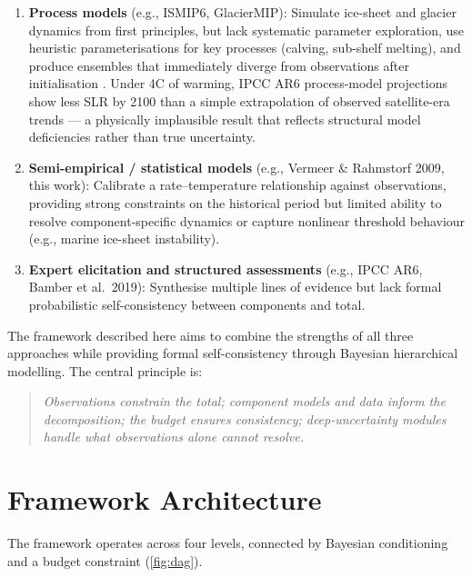 \documentclass[11pt]{article}
\begin{document}
\begin{enumerate}
  \item \textbf{Process models} (e.g., ISMIP6, GlacierMIP): Simulate ice-sheet and glacier dynamics from first principles, but lack systematic parameter exploration, use heuristic parameterisations for key processes (calving, sub-shelf melting), and produce ensembles that immediately diverge from observations after initialisation \citep{fricker2025antarctica}.  Under 4\textdegree C of warming, IPCC AR6 process-model projections show less SLR by 2100 than a simple extrapolation of observed satellite-era trends --- a physically implausible result that reflects structural model deficiencies rather than true uncertainty.

  \item \textbf{Semi-empirical / statistical models} (e.g., Vermeer \& Rahmstorf 2009, this work): Calibrate a rate--temperature relationship against observations, providing strong constraints on the historical period but limited ability to resolve component-specific dynamics or capture nonlinear threshold behaviour (e.g., marine ice-sheet instability).

  \item \textbf{Expert elicitation and structured assessments} (e.g., IPCC AR6, Bamber et al.\ 2019): Synthesise multiple lines of evidence but lack formal probabilistic self-consistency between components and total.
\end{enumerate}

The framework described here aims to combine the strengths of all three approaches while providing formal self-consistency through Bayesian hierarchical modelling.  The central principle is:

\begin{quote}
\emph{Observations constrain the total; component models and data inform the decomposition; the budget ensures consistency; deep-uncertainty modules handle what observations alone cannot resolve.}
\end{quote}


\section{Framework Architecture}

The framework operates across four levels, connected by Bayesian conditioning and a budget constraint (\cref{fig:dag}).
\end{document}
